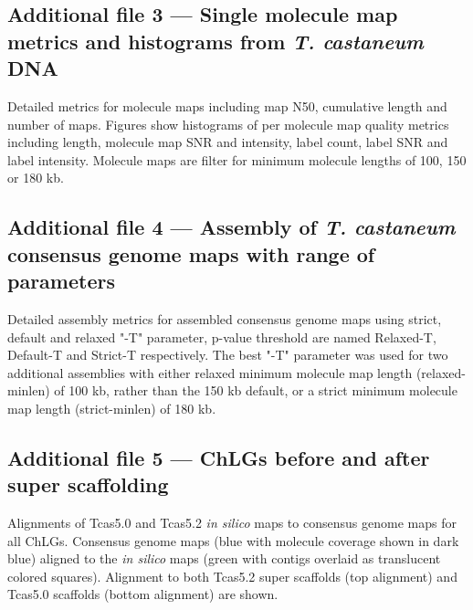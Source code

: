 \documentclass{bmcart}
\begin{document}
\begin{backmatter}
  \subsection*{Additional file 3 --- Single molecule map metrics and histograms from \textit{T. castaneum} DNA}
    Detailed metrics for molecule maps including map N50, cumulative length and number of maps. Figures show histograms of per molecule map quality metrics including length, molecule map SNR and intensity, label count, label SNR and label intensity. Molecule maps are filter for minimum molecule lengths of 100, 150 or 180 kb.

  \subsection*{Additional file 4 --- Assembly of \textit{T. castaneum} consensus genome maps with range of parameters}
    Detailed assembly metrics for assembled consensus genome maps using strict, default and relaxed "-T" parameter, p-value threshold are named Relaxed-T, Default-T and Strict-T respectively. The best "-T" parameter was used for two additional assemblies with either relaxed minimum molecule map length (relaxed-minlen) of 100 kb, rather than the 150 kb default, or a strict minimum molecule map length (strict-minlen) of 180 kb. 

  \subsection*{Additional file 5 --- ChLGs before and after super scaffolding }
    Alignments of Tcas5.0 and Tcas5.2 \textit{in silico} maps to consensus genome maps for all ChLGs. Consensus genome maps (blue with molecule coverage shown in dark blue) aligned to the \textit{in silico} maps (green with contigs overlaid as translucent colored squares). Alignment to both Tcas5.2 super scaffolds (top alignment) and Tcas5.0 scaffolds (bottom alignment) are shown.



\end{backmatter}
\end{document}
